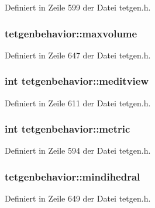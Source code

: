 Definiert in Zeile 599 der Datei tetgen.\-h.

\hypertarget{classtetgenbehavior_a8f6cea3179c0be4c104e4a79392952da}{
\subsubsection[{maxvolume}]{ tetgenbehavior\-::maxvolume}}\label{classtetgenbehavior_a8f6cea3179c0be4c104e4a79392952da}


Definiert in Zeile 647 der Datei tetgen.\-h.

\hypertarget{classtetgenbehavior_afe5542a09d5b89e57362ddfb19b50b39}{
\subsubsection[{meditview}]{\setlength{\rightskip}{0pt plus 5cm}int tetgenbehavior\-::meditview}}\label{classtetgenbehavior_afe5542a09d5b89e57362ddfb19b50b39}


Definiert in Zeile 611 der Datei tetgen.\-h.

\hypertarget{classtetgenbehavior_ad3c713eee4e296ce83387b778975a0ee}{
\subsubsection[{metric}]{\setlength{\rightskip}{0pt plus 5cm}int tetgenbehavior\-::metric}}\label{classtetgenbehavior_ad3c713eee4e296ce83387b778975a0ee}


Definiert in Zeile 594 der Datei tetgen.\-h.

\hypertarget{classtetgenbehavior_aa48e21ee0ac18d3adadea746e9e39055}{
\subsubsection[{mindihedral}]{ tetgenbehavior\-::mindihedral}}\label{classtetgenbehavior_aa48e21ee0ac18d3adadea746e9e39055}


Definiert in Zeile 649 der Datei tetgen.\-h.

